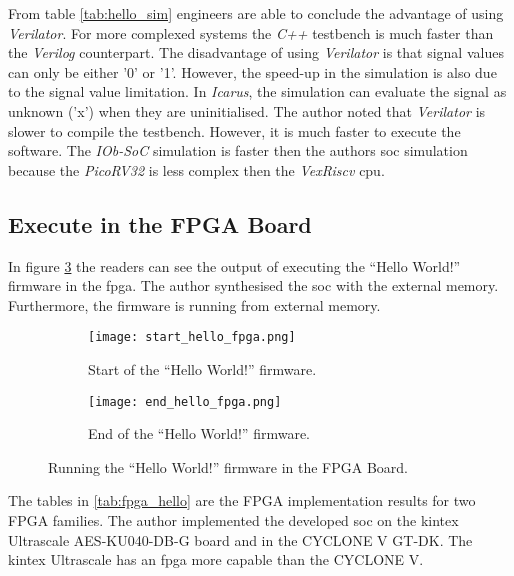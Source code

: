 From table \ref{tab:hello_sim} engineers are able to conclude the advantage of using \textit{Verilator}. For more complexed systems the \textit{C++} testbench is much faster than the \textit{Verilog} counterpart. The disadvantage of using \textit{Verilator} is that signal values can only be either '0' or '1'. However, the speed-up in the simulation is also due to the signal value limitation. In \textit{Icarus}, the simulation can evaluate the signal as unknown ('x') when they are uninitialised. The author noted that \textit{Verilator} is slower to compile the testbench. However, it is much faster to execute the software. The \textit{IOb-SoC} simulation is faster then the authors \acrshort{soc} simulation because the \textit{PicoRV32} is less complex then the \textit{VexRiscv} \acrshort{cpu}.

\subsection{Execute in the FPGA Board}
In figure \ref{fig:hello_fpga} the readers can see the output of executing the \enquote{Hello World!} firmware in the \acrshort{fpga}. The author synthesised the \acrshort{soc} with the external memory. Furthermore, the firmware is running from external memory.

\begin{figure}[!ht]
    \centering
    \begin{subfigure}[b]{0.49\textwidth}
        \centering
        \texttt{[image: start\_hello\_fpga.png]}
        \caption{Start of the \enquote{Hello World!} firmware.}
        \label{fig:start_hello_fpga}
    \end{subfigure}
    \hfill
    \begin{subfigure}[b]{0.49\textwidth}
        \centering
        \texttt{[image: end\_hello\_fpga.png]}
        \caption{End of the \enquote{Hello World!} firmware.}
        \label{fig:end_hello_fpga}
    \end{subfigure}
    \caption{Running the \enquote{Hello World!} firmware in the FPGA Board.}
    \label{fig:hello_fpga}
\end{figure}

The tables in \ref{tab:fpga_hello} are the FPGA implementation results for two FPGA families. The author implemented the developed \acrshort{soc} on the kintex Ultrascale AES-KU040-DB-G board and in the CYCLONE V GT-DK. The kintex Ultrascale has an \acrshort{fpga} more capable than the CYCLONE V.

